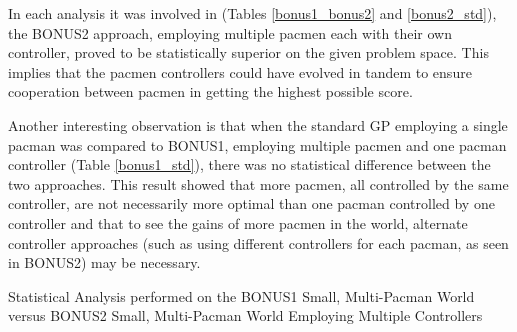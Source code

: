 \documentclass[11pt]{article}
\newcommand{\tablecaption}[1]{\caption{Statistical Analysis performed on the {#1}}}
\begin{document}
In each analysis it was involved in (Tables \ref{bonus1_bonus2} and \ref{bonus2_std}), the BONUS2 approach, 
employing multiple pacmen each with their own controller,
proved to be statistically superior on the given problem space. This implies that the pacmen controllers could have evolved
in tandem to ensure cooperation between pacmen in getting the highest possible score.

Another interesting observation is that when the standard GP employing a single pacman was compared to BONUS1, employing multiple
pacmen and one pacman controller (Table \ref{bonus1_std}), there was no statistical difference between the two approaches.
This result showed that more pacmen, all controlled by the same controller, are not necessarily more optimal than one pacman
controlled by one controller and that to see the gains of more pacmen in the world, alternate controller approaches (such
as using different controllers for each pacman, as seen in BONUS2) may be necessary.


\begin{table}[H] 
\tablecaption{BONUS1 Small, Multi-Pacman World versus BONUS2 Small, Multi-Pacman World Employing Multiple Controllers}        
\label{bonus1_bonus2}                 
\end{table}
\end{document}
